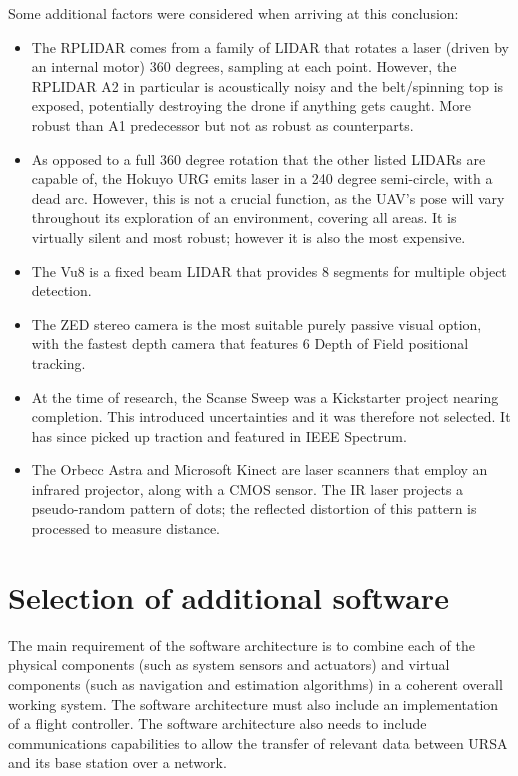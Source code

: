 \documentclass[capstone_report.tex]{subfiles}
\begin{document}
Some additional factors were considered when arriving at this conclusion:
\begin{itemize}
\item The RPLIDAR comes from a family of LIDAR that rotates a laser (driven by an internal motor) 360 degrees, sampling at each point. However, the RPLIDAR A2 in particular is acoustically noisy and the belt/spinning top is exposed, potentially destroying the drone if anything gets caught. More robust than A1 predecessor but not as robust as counterparts.
\item As opposed to a full 360 degree rotation that the other listed LIDARs are capable of, the Hokuyo URG emits laser in a 240 degree semi-circle, with a dead arc. However, this is not a crucial function, as the UAV’s pose will vary throughout its exploration of an environment, covering all areas. It is virtually silent and most robust; however it is also the most expensive.
\item The Vu8 is a fixed beam LIDAR that provides 8 segments for multiple object detection.
\item The ZED stereo camera is the most suitable purely passive visual option, with the fastest depth camera that features 6 Depth of Field positional tracking.
\item At the time of research, the Scanse Sweep was a Kickstarter project nearing completion. This introduced uncertainties and it was therefore not selected. It has since picked up traction and featured in IEEE Spectrum\cite{scanse}.
\item The Orbecc Astra and Microsoft Kinect are laser scanners that employ an infrared projector, along with a CMOS sensor. The IR laser projects a pseudo-random pattern of dots; the reflected distortion of this pattern is processed to measure distance.
\end{itemize}

\section{Selection of additional software}
The main requirement of the software architecture is to combine each of the physical components (such as system sensors and actuators) and virtual components (such as navigation and estimation algorithms) in a coherent overall working system. The software architecture must also include an implementation of a flight controller. The software architecture also needs to include communications capabilities to allow the transfer of relevant data between URSA and its base station over a network.\\
\end{document}
